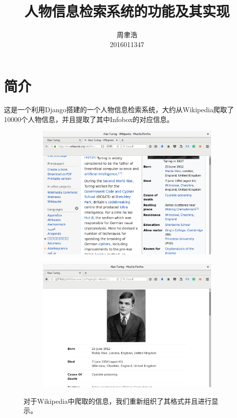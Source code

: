 \documentclass[11pt,a4paper]{article}
\title{人物信息检索系统的功能及其实现}
\author{周聿浩\\ \small{2016011347}}
\begin{document}
\maketitle
\section{简介}
这是一个利用Django搭建的一个人物信息检索系统，大约从Wikipedia爬取了10000个人物信息，并且提取了其中Infobox的对应信息。

\begin{figure}[H]
	\centering
	\begin{subfigure}{.49\textwidth}
		\centering
		\includegraphics[width=\linewidth]{wiki.png}
	\end{subfigure}
	\hfill
	\begin{subfigure}{.49\textwidth}
		\centering
		\includegraphics[width=\linewidth]{turing-1.png}
	\end{subfigure}
	\caption{对于Wikipedia中爬取的信息，我们重新组织了其格式并且进行显示。}
\end{figure}
\end{document}
